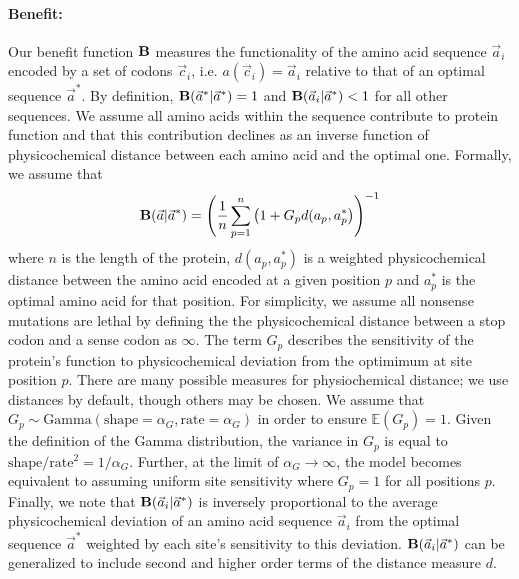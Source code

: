\documentclass[12pt,letterpaper,fleqn]{article}
\newcommand{\PC}{physicochemical\xspace}
\newcommand{\EE}{\mathbb{E}} %
\newcommand{\Funcaoptvec}{\ensuremath{\Func(\aoptvec|\aoptvec)}\xspace}
\newcommand{\Funcaveci}{\ensuremath{\Func(\aveci|\aoptvec)}\xspace}
\newcommand{\Funcavec}{\ensuremath{\Func(\avec|\aoptvec)}\xspace}
\newcommand{\Func}{\ensuremath{\text{\textbf{B}}}\xspace}
\newcommand{\alphag}{\ensuremath{\alpha_G}\xspace}
\newcommand{\aoptp}{\ensuremath{a^*_p}\xspace}
\newcommand{\aoptvec}{\ensuremath{\Vec{a}^*}\xspace}
\newcommand{\aveci}{\ensuremath{\Vec{a}_i}\xspace}
\newcommand{\avec}{\ensuremath{\Vec{a}}\xspace}
\newcommand{\cveci}{\ensuremath{\cvec_i}\xspace}
\newcommand{\cvec}{\ensuremath{\Vec{c}}\xspace}
\newcommand{\gp}{\ensuremath{{G_p}}\xspace}
\begin{document}
\paragraph{Benefit:}
Our benefit function \Func measures the functionality of the amino acid sequence \aveci encoded by a set of codons \cveci, i.e. $a(\cveci) = \aveci$ relative to that of an optimal sequence $\aoptvec$.
By definition, $\Funcaoptvec = 1$ and $\Funcaveci < 1$ for all other sequences.
We assume all amino acids within the sequence contribute to protein function and that this contribution declines as an inverse function of physicochemical distance between each amino acid and the optimal one.
Formally, we assume that
\begin{equation}
\Funcavec = \left(\frac{1}{n} \sum_{p=1}^n \left(1 + \gp d(a_p, \aoptp\right)\right)^{-1}
\end{equation}
where $n$ is the length of the protein, $d(a_p, \aoptp)$ is a weighted physicochemical distance between the amino acid encoded at a given position $p$ and $\aoptp$ is the optimal amino acid for that position.
For simplicity, we assume all nonsense mutations are lethal by defining the the \PC distance between a stop codon and a sense codon as $\infty$.
The term \gp describes the sensitivity of the protein's function to physicochemical deviation from the optimimum at site position $p$.
There are many possible measures for physiochemical distance; we use \citet{Grantham1974} distances by default, though others may be chosen.
We assume that $\gp \sim \text{Gamma}\left(\text{shape} = \alphag, \text{rate} = \alphag\right)$ in order to ensure $\EE(\gp) = 1$.
Given the definition of the Gamma distribution, the variance in \gp is equal to $\text{shape}/\text{rate}^2 = 1/\alphag$.
Further, at the limit of $\alphag \rightarrow \infty$, the model becomes equivalent to assuming uniform site sensitivity where  $\gp = 1$ for all positions $p$.
Finally, we note that  \Funcaveci is inversely proportional to the average physicochemical deviation of an amino acid sequence \aveci from the optimal sequence \aoptvec weighted by each site's sensitivity to this deviation.
\Funcaveci can be generalized to include second and higher order terms of the distance measure $d$.
\end{document}
